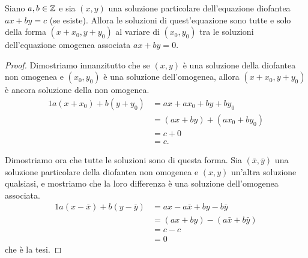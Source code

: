 \begin{theorem}  \label{sol_diofantea_non_omog}
    Siano $a, b \in \mathbb{Z}$ e sia $(x, y)$ una soluzione particolare dell'equazione diofantea $ax + by = c$ (se esiste). Allora le soluzioni di quest'equazione sono tutte e solo della forma $(x + x_0, y + y_0)$ al variare di $(x_0, y_0)$ tra le soluzioni dell'equazione omogenea associata $ax + by = 0$.
\end{theorem}
\begin{proof}
    Dimostriamo innanzitutto che se $(x, y)$ è una soluzione della diofantea non omogenea e $(x_0, y_0)$ è una soluzione dell'omogenea, allora $(x+x_0, y+y_0)$ è ancora soluzione della non omogenea.
    \begin{alignat*}{1}
        a(x + x_0) + b(y + y_0) &= ax + ax_0 + by + by_0 \\
                                &= (ax + by) + (ax_0 + by_0) \\
                                &= c + 0\\
                                &= c.
    \end{alignat*}

    Dimostriamo ora che tutte le soluzioni sono di questa forma. Sia $(\bar{x}, \bar{y})$ una soluzione particolare della diofantea non omogenea e $(x, y)$ un'altra soluzione qualsiasi, e mostriamo che la loro differenza è una soluzione dell'omogenea associata.
    \begin{alignat*}
        {1}
        a(x - \bar{x}) + b(y - \bar{y}) &= ax - a\bar{x} + by - b\bar{y} \\
                                        &= (ax + by) - (a\bar{x} + b\bar{y}) \\
                                        &= c - c\\
                                        &= 0
    \end{alignat*}
    che è la tesi.
\end{proof}
